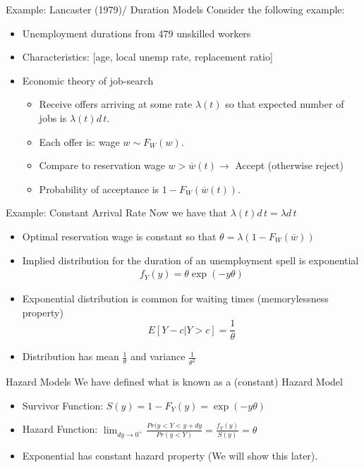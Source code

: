 \documentclass[aspectratio=169]{beamer}
\begin{document}
\begin{frame}{Example: Lancaster (1979)/ Duration Models}
Consider the following example:
\begin{itemize}
\item Unemployment durations from 479 unskilled workers
\item Characteristics: [age, local unemp rate, \alert{replacement ratio}]
\item Economic theory of job-search
\begin{itemize}
\item Receive offers arriving at some rate $\lambda(t)$ so that expected number of jobs is $\lambda(t) d\,t$.
\item Each offer is: wage $w \sim F_{W}(w)$.
\item Compare to reservation wage $w > \overline{w}(t) \rightarrow$ Accept  (otherwise reject)
\item Probability of acceptance is $1 - F_{W}(\overline{w}(t))$.
\end{itemize}
\end{itemize}
\end{frame}


\begin{frame}{Example: Constant Arrival Rate}
Now we have that $\lambda(t) d\,t= \lambda d\,t$
\begin{itemize}
\item Optimal reservation wage is constant so that $\theta = \lambda (1 - F_{W}(\overline{w}) )$
\item Implied distribution for the \alert{duration} of an unemployment \alert{spell} is \alert{exponential} 
\begin{align*}
f_Y(y) = \theta \exp(-y \theta)
\end{align*}
\item Exponential distribution is common for waiting times (\alert{memorylessness property}) $$E[Y-c | Y > c] = \frac{1}{\theta}$$
\item Distribution has mean $\frac{1}{\theta}$ and variance $\frac{1}{\theta^2}$
\end{itemize}
\end{frame}


\begin{frame}{Hazard Models}
We have defined what is known as a (constant) \alert{Hazard Model}
\begin{itemize}
\item Survivor Function: $S(y) = 1 - F_Y(y) = \exp(-y \theta)$
\item Hazard Function: $\lim_{dy \rightarrow 0^{+}} \frac{Pr(y < Y < y +dy}{Pr(y < Y)} =\frac{f_Y(y)}{S(y)} = \theta$
\item Exponential has \alert{constant hazard property} (We will show this later).
\end{itemize}
\end{frame}
\end{document}
